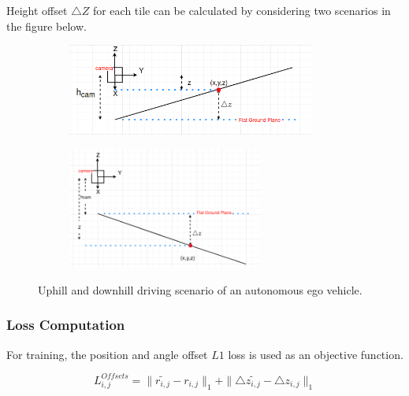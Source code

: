         
        Height offset $\triangle Z$ for each tile can be calculated by considering two scenarios in the figure below. 
        \begin{figure}[h]
        \centering
        \begin{subfigure}{0.4\textwidth}
        \includegraphics[width=1.2\linewidth, height=3cm]{images/delta_z_uphill.png} 
        \caption{}
        \label{fig:subim1}
        \end{subfigure}
        \begin{subfigure}{0.4\textwidth}
        \includegraphics[width=1\linewidth, height=4cm]{images/delat_z_downhill.png}
        \caption{}
        \label{fig:subim2}
        \end{subfigure}
        
        \caption{Uphill and downhill driving scenario of an autonomous ego vehicle.}
        \label{fig:image2}
        \end{figure}
        
        
        \subsubsection{Loss Computation}
            For training, the position and angle offset $L1$ loss is used as an objective function. 
            
            \begin{equation}
                L^{Offsets}_{i,j} = \parallel \widetilde{r_{i,j}} - r_{i,j} \parallel_{1} + \parallel \triangle{\widetilde{z_{i,j}}} - \triangle{z_{i,j}} \parallel_{1} 
             \end{equation}
             
